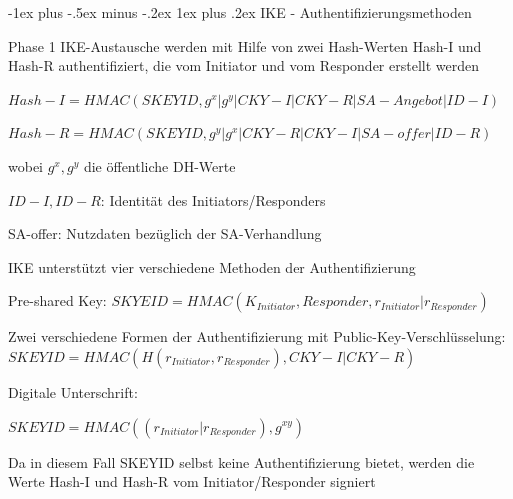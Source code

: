 \documentclass[a4paper]{article}
\makeatletter
\renewcommand{\subsubsection}{\@startsection{subsubsection}{3}{0mm}%
 {-1ex plus -.5ex minus -.2ex}%
 {1ex plus .2ex}%
 {\normalfont\small\bfseries}}
\makeatother
\begin{document}
\begin{multicols}{3}
      \subsubsection{IKE - Authentifizierungsmethoden}
      \begin{itemize*}
            \item Phase 1 IKE-Austausche werden mit Hilfe von zwei Hash-Werten Hash-I und Hash-R authentifiziert, die vom Initiator und vom Responder erstellt werden
            \begin{itemize*}
                  \item $Hash-I = HMAC(SKEYID, g^x | g^y | CKY-I | CKY-R | SA-Angebot | ID-I)$
                  \item $Hash-R = HMAC(SKEYID, g^y | g^x | CKY-R | CKY-I | SA-offer | ID-R)$
                  \item wobei $g^x, g^y$ die öffentliche DH-Werte
                  \item $ID-I, ID-R$: Identität des Initiators/Responders
                  \item SA-offer: Nutzdaten bezüglich der SA-Verhandlung
            \end{itemize*}
            \item IKE unterstützt vier verschiedene Methoden der Authentifizierung
      \end{itemize*}
      \begin{enumerate*}
            \item Pre-shared Key: $SKYEID = HMAC(K_{Initiator}, Responder , r_{Initiator} | r_{Responder})$
            \item Zwei verschiedene Formen der Authentifizierung mit Public-Key-Verschlüsselung:  $SKEYID = HMAC(H(r_{Initiator}, r_{Responder}), CKY-I | CKY-R)$
            \item Digitale Unterschrift:
            \begin{itemize*}
                  \item $SKEYID = HMAC((r_{Initiator} | r_{Responder}), g^{xy})$
                  \item Da in diesem Fall SKEYID selbst keine Authentifizierung bietet, werden die Werte Hash-I und Hash-R vom Initiator/Responder signiert
            \end{itemize*}
      \end{enumerate*}


\end{multicols}
\end{document}
